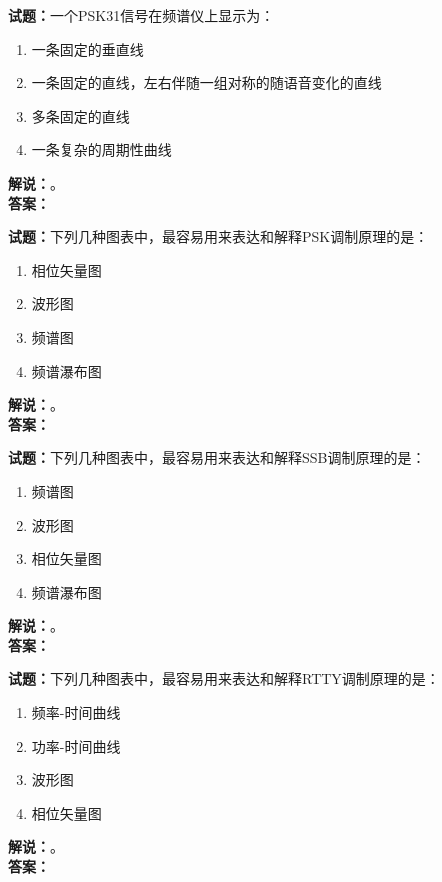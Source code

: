 \documentclass{ctexbook}
\begin{document}
\bigskip




\noindent\textbf{试题：}一个PSK31信号在频谱仪上显示为：
\begin{enumerate}[leftmargin=3em]
\item 一条固定的垂直线
\item 一条固定的直线，左右伴随一组对称的随语音变化的直线
\item 多条固定的直线
\item 一条复杂的周期性曲线
\end{enumerate}
\noindent\textbf{解说：}\textbf{}。\\\noindent\textbf{答案：}

\bigskip




\noindent\textbf{试题：}下列几种图表中，最容易用来表达和解释PSK调制原理的是：
\begin{enumerate}[leftmargin=3em]
\item 相位矢量图
\item 波形图
\item 频谱图
\item 频谱瀑布图
\end{enumerate}
\noindent\textbf{解说：}\textbf{}。\\\noindent\textbf{答案：}

\bigskip




\noindent\textbf{试题：}下列几种图表中，最容易用来表达和解释SSB调制原理的是：
\begin{enumerate}[leftmargin=3em]
\item 频谱图
\item 波形图
\item 相位矢量图
\item 频谱瀑布图
\end{enumerate}
\noindent\textbf{解说：}\textbf{}。\\\noindent\textbf{答案：}

\bigskip




\noindent\textbf{试题：}下列几种图表中，最容易用来表达和解释RTTY调制原理的是：
\begin{enumerate}[leftmargin=3em]
\item 频率-时间曲线
\item 功率-时间曲线
\item 波形图
\item 相位矢量图
\end{enumerate}
\noindent\textbf{解说：}\textbf{}。\\\noindent\textbf{答案：}
\end{document}

